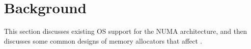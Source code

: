 \section{Background}
\label{sec:overview}

This section discusses existing OS support for the NUMA architecture, and then discusses some common designs of memory allocators that affect \NM{}.  

\begin{comment}

\todo{Cutting half for this section}

\subsection{NUMA Architecture}

\label{sec:numa}

Traditional computers are using the Uniform Memory Access (UMA) model that all CPU cores are sharing a single memory controller, where any core can access the memory with the same latency (uniformly). However, the UMA architecture cannot accommodate the hardware trend with the increasing number of cores, since all of them may compete for the same memory controller. Therefore, the performance bottleneck is the memory controller in many-core machines, since a task cannot proceed without getting its necessary data from the memory. 

The Non-Uniform Memory Access (NUMA) architecture is proposed to solve the scalability issue, due to its decentralized nature. Instead of making all cores waiting for the same memory controller, the NUMA architecture typically is installed with multiple memory controllers, where a group of CPU cores has its memory controller (called as a node). Due to multiple memory controllers, the contention for the memory controller could be largely reduced and therefore the scalability could be improved correspondingly. However, the NUMA architecture also has multiple sources of performance degradations~\cite{Blagodurov:2011:CNC:2002181.2002182}, including \textit{Cache Contention}, \textit{Node Imbalance}, \textit{Interconnect Congestion}, and \textit{Remote Accesses}. 

\paragraph{Cache Contention:} the NUMA architecture is prone to cache contention that multiple tasks may compete for the shared cache. Cache contention will introduce more serious performance issue if the data has to be loaded from a remote node. 
 

\end{comment}
